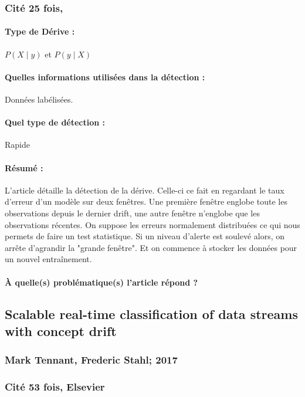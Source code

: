\documentclass[11pt,a4paper]{report}
\begin{document}
\subsubsection{Cité 25 fois, }

\paragraph{Type de Dérive :} $P(X\mid y)$ et $P(y \mid X)$ 
\paragraph{Quelles informations utilisées dans la détection :} Données labélisées.
\paragraph{Quel type de détection :} Rapide

\paragraph{Résumé :} L'article détaille la détection de la dérive. Celle-ci ce fait en regardant le taux d'erreur d'un modèle sur deux fenêtres. Une première fenêtre englobe toute les observations depuis le dernier drift, une autre fenêtre n'englobe que les observations récentes. On suppose les erreurs normalement distribuées ce qui nous permets de faire un test statistique. Si un niveau d'alerte est soulevé alors, on arrête d'agrandir la "grande fenêtre". Et on commence à stocker les données pour un nouvel entraînement.

\paragraph{À quelle(s) problématique(s) l'article répond ?} 





\subsection{Scalable real-time classification of data streams with concept drift}
\subsubsection{Mark Tennant, Frederic Stahl; 2017}
\subsubsection{Cité 53 fois, Elsevier}
\end{document}
